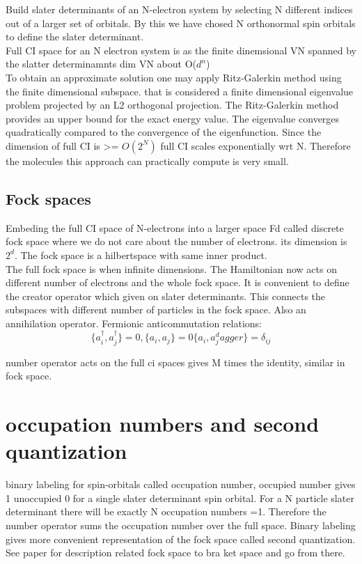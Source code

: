 \documentclass[10pt, draft]{article}
\begin{document}
 Build slater determinants of an N-electron system by selecting N different indices out of a larger set of orbitals.  By this we have chosed N orthonormal spin orbitals to define the slater determinant.  \\
 Full CI space for an N electron system is as the finite dinemsional VN spanned by the slatter determinamnts dim VN about O($d^n$)\\
 
 To obtain an approximate solution one may apply Ritz-Galerkin method using the finite dimensional subspace.  that is considered a finite dimensional eigenvalue problem projected by an L2 orthogonal projection.  The Ritz-Galerkin method provides an upper bound for the exact energy value.  The eigenvalue converges quadratically compared to the convergence of the eigenfunction. Since the dimension of full CI is >= $O(2^N)$ full CI scales exponentially wrt N. Therefore the molecules this approach can practically compute is very small.
 
 \subsection{Fock spaces}
 
 Embeding the full CI space of N-electrons into a larger space Fd called discrete fock space where we do not care about the number of electrons.  its dimension is $2^d$.  The fock space is a hilbertspace with same inner product.\\
 
 The full fock space is when infinite dimensions.  The Hamiltonian now acts on different number of electrons and the whole fock space.  It is convenient to define the creator operator which given on slater determinants.  This connects the subspaces with different number of particles in the fock space.  Also an annihilation operator.  Fermionic anticommutation relations: 
 \[\{a_i^\dagger , a_j^\dagger\} =0,  \{a_i, a_j\} =0 \{a_i, a_j^dagger\} = \delta_{ij}\]
 
 number operator acts on the full ci spaces gives M times the identity, similar in fock space.
 
 \section{occupation numbers and second quantization}
 
 binary labeling for spin-orbitals called occupation number, occupied number gives 1 unoccupied 0 for a single slater determinant spin orbital.  For a N particle slater determinant there will be exactly N occupation numbers =1.  Therefore the number operator sums the occupation number over the full space.  Binary labeling gives more convenient representation of the fock space called second quantization.  See paper for description related fock space to bra ket space and go from there.
 
\end{document}
